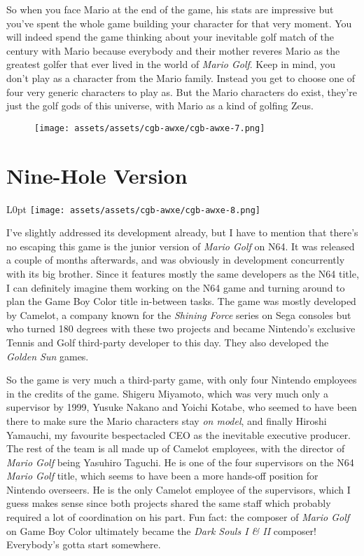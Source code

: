 \documentclass{book}
\begin{document}
So when you face Mario at the end of the game, his stats are impressive but you’ve spent the whole game building your character for that very moment. You will indeed spend the game thinking about your inevitable golf match of the century with Mario because everybody and their mother reveres Mario as the greatest golfer that ever lived in the world of \emph{Mario Golf}. Keep in mind, you don’t play as a character from the Mario family. Instead you get to choose one of four very generic characters to play as. But the Mario characters do exist, they’re just the golf gods of this universe, with Mario as a kind of golfing Zeus.

\begin{figure}[hbt]
\vskip 10pt
\centering \texttt{[image: assets/assets/cgb-awxe/cgb-awxe-7.png]}
\vskip 6pt
\end{figure}

\FloatBarrier\needspace{5pt}\section*{Nine-Hole Version}\nopagebreak[4]

\begin{wrapfigure}{L}{0pt} \texttt{[image: assets/assets/cgb-awxe/cgb-awxe-8.png]}\end{wrapfigure}
I’ve slightly addressed its development already, but I have to mention that there’s no escaping this game is the junior version of \emph{Mario Golf} on N64. It was released a couple of months afterwards, and was obviously in development concurrently with its big brother. Since it features mostly the same developers as the N64 title, I can definitely imagine them working on the N64 game and turning around to plan the Game Boy Color title in-between tasks. The game was mostly developed by Camelot, a company known for the \emph{Shining Force} series on Sega consoles but who turned 180 degrees with these two projects and became Nintendo’s exclusive Tennis and Golf third-party developer to this day. They also developed the \emph{Golden Sun} games.

So the game is very much a third-party game, with only four Nintendo employees in the credits of the game. Shigeru Miyamoto, which was very much only a supervisor by 1999, Yusuke Nakano and Yoichi Kotabe, who seemed to have been there to make sure the Mario characters stay \emph{on model}, and finally Hiroshi Yamauchi, my favourite bespectacled CEO as the inevitable executive producer. The rest of the team is all made up of Camelot employees, with the director of \emph{Mario Golf} being Yasuhiro Taguchi. He is one of the four supervisors on the N64 \emph{Mario Golf} title, which seems to have been a more hands-off position for Nintendo overseers. He is the only Camelot employee of the supervisors, which I guess makes sense since both projects shared the same staff which probably required a lot of coordination on his part. Fun fact: the composer of \emph{Mario Golf} on Game Boy Color ultimately became the \emph{Dark Souls I \& II} composer! Everybody’s gotta start somewhere.
\end{document}
